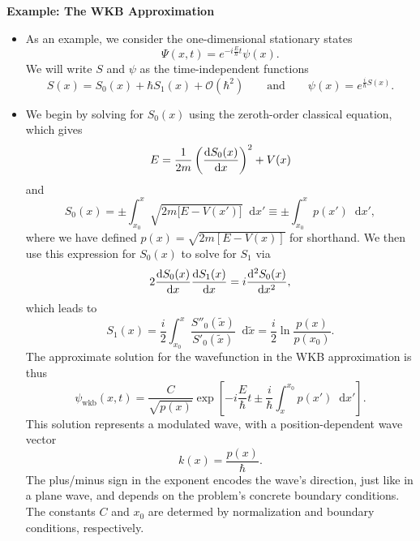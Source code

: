 \documentclass[11pt, a4paper]{article}
\newcommand{\diff}{\mathop{}\!\mathrm{d}} %
\begin{document}
\textbf{Example: The WKB Approximation}
\begin{itemize}
    \item As an example, we consider the one-dimensional stationary states
    \begin{equation*}
        \Psi(x, t) = e^{-i \frac{E}{\hbar}t} \psi(x).
    \end{equation*}
    We will write $ S $ and $ \psi $ as the time-independent functions
    \begin{equation*}
        S(x) = S_{0}(x) + \hbar S_{1}(x) + \mathcal{O}(\hbar^{2}) \qquad \text{and} \qquad \psi(x) = e^{\frac{i}{\hbar}S(x)}.
    \end{equation*}
    
    \item We begin by solving for $ S_{0}(x) $ using the zeroth-order classical equation, which gives
    \begin{equation*}
        E = \frac{1}{2m}\left( \dv{S_{0}(x)}{x} \right)^{2} + V(x)
    \end{equation*}
    and
    \begin{equation*}
        S_{0}(x) = \pm \int_{x_{0}}^{x} \sqrt{2m \big[ E - V(x') \big]}\diff x' \equiv \pm \int_{x_{0}}^{x}p(x')\diff x',
    \end{equation*}
    where we have defined $ p(x) = \sqrt{2m [E - V(x)]} $ for shorthand. We then use this expression for $ S_{0}(x) $ to solve for $ S_{1} $ via
    \begin{equation*}
        2 \dv{S_{0}(x)}{x} \dv{S_{1}(x)}{x} = i \dv[2]{S_{0}(x)}{x},
    \end{equation*}
    which leads to
    \begin{equation*}
        S_{1}(x) = \frac{i}{2} \int_{x_{0}}^{x}\frac{S''_{0}(\tilde{x})}{S'_{0}(\tilde{x})} \diff \tilde{x} = \frac{i}{2} \ln \frac{p(x)}{p(x_{0})}.
    \end{equation*}
    The approximate solution for the wavefunction in the WKB approximation is thus
    \begin{equation*}
        \psi_{\text{wkb}}(x, t) = \frac{C}{\sqrt{p(x)}}\exp \left[ -i \frac{E}{\hbar}t \pm \frac{i}{\hbar}\int_{x}^{x_{0}} p(x')\diff x' \right].
    \end{equation*}
    This solution represents a modulated wave, with a position-dependent wave vector
    \begin{equation*}
        k(x) = \frac{p(x)}{\hbar}.
    \end{equation*}
    The plus/minus sign in the exponent encodes the wave's direction, just like in a plane wave, and depends on the problem's concrete boundary conditions. The constants $ C $ and $ x_{0} $ are determed by normalization and boundary conditions, respectively.

\end{itemize}
\end{document}

